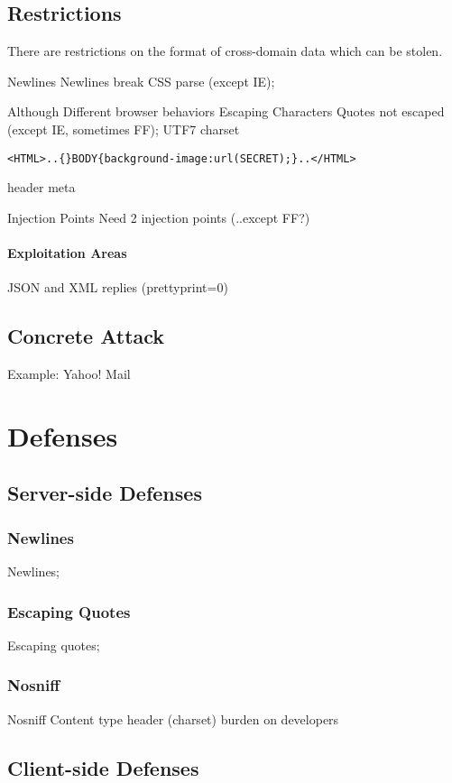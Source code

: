 \documentclass{acm_proc_article-sp}
\begin{document}
\subsection{Restrictions}
There are restrictions on the format of cross-domain data which can be stolen.

Newlines
Newlines break CSS parse (except IE);

Although Different browser behaviors
Escaping Characters
Quotes not escaped (except IE, sometimes FF);
UTF7 charset
\begin{verbatim}
<HTML>..{}BODY{background-image:url(SECRET);}..</HTML>
\end{verbatim}
header meta

Injection Points
Need 2 injection points (..except FF?)

\paragraph{Exploitation Areas}
JSON and XML replies
(prettyprint=0)

\subsection{Concrete Attack}
Example: Yahoo! Mail

\section{Defenses}

\subsection{Server-side Defenses}
\subsubsection{Newlines}
Newlines;
\subsubsection{Escaping Quotes}
Escaping quotes;
\subsubsection{Nosniff}
Nosniff
Content type header (charset)
burden on developers

\subsection{Client-side Defenses}
\end{document}
